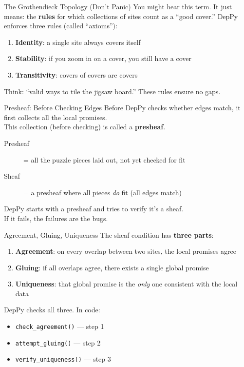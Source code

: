 \documentclass[aspectratio=169,10pt]{beamer}
\newcommand{\hint}[1]{\begin{center}
  \colorbox{hintbg}{\parbox{0.88\textwidth}{\centering\small #1}}\end{center}}
\begin{document}
\begin{frame}{The Grothendieck Topology (Don't Panic)}
You might hear this term. It just means: the \textbf{rules} for which collections of sites count as a ``good cover.''
\vspace{0.5em}
DepPy enforces three rules (called ``axioms''):
\begin{enumerate}
  \item \textbf{Identity}: a single site always covers itself
  \item \textbf{Stability}: if you zoom in on a cover, you still have a cover
  \item \textbf{Transitivity}: covers of covers are covers
\end{enumerate}
\vspace{0.3em}
\hint{Think: ``valid ways to tile the jigsaw board.'' These rules ensure no gaps.}
\end{frame}

\begin{frame}{Presheaf: Before Checking Edges}
Before DepPy checks whether edges match, it first collects all the local promises.\\
This collection (before checking) is called a \textbf{presheaf}.
\vspace{0.5em}
\begin{description}
  \item[Presheaf] = all the puzzle pieces laid out, not yet checked for fit
  \item[Sheaf] = a presheaf where all pieces \emph{do} fit (all edges match)
\end{description}
\vspace{0.3em}
DepPy starts with a presheaf and tries to verify it's a sheaf.\\
If it fails, the failures are the bugs.
\end{frame}

\begin{frame}{Agreement, Gluing, Uniqueness}
The sheaf condition has \textbf{three parts}:
\vspace{0.3em}
\begin{enumerate}
  \item \textbf{Agreement}: on every overlap between two sites, the local promises agree
  \item \textbf{Gluing}: if all overlaps agree, there exists a single global promise
  \item \textbf{Uniqueness}: that global promise is the \emph{only} one consistent with the local data
\end{enumerate}
\vspace{0.3em}
DepPy checks all three. In code:
\begin{itemize}
  \item \texttt{check\_agreement()} --- step 1
  \item \texttt{attempt\_gluing()} --- step 2
  \item \texttt{verify\_uniqueness()} --- step 3
\end{itemize}
\end{frame}
\end{document}
